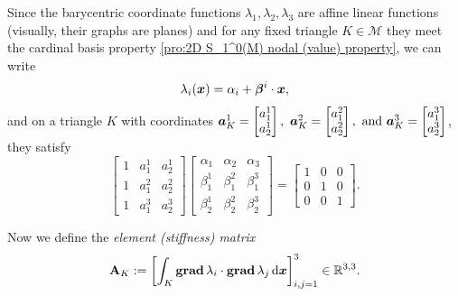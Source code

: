 	Since the barycentric coordinate functions 
	$\lambda_1,\lambda_2,\lambda_3$ are affine linear functions (visually, 
	their graphs are planes) and for any fixed triangle $K\in\mathcal{M}$
 	they meet the cardinal basis property
	\eqref{pro:2D S_1^0(M) nodal (value) property}, we can write
	\begin{equation}
		\lambda_i(\bm{x})=\alpha_i+\bm{\beta}^i\cdot\bm{x},
	\end{equation}
	and on a triangle $K$ with coordinates $
	\ba_K^1=\begin{bmatrix}a^1_1\\a^1_2\end{bmatrix},\ 
	\ba_K^2=\begin{bmatrix}a^2_1\\a^2_2\end{bmatrix},\ \textrm{and }
	\ba_K^3=\begin{bmatrix}a^3_1\\a^3_2\end{bmatrix}$,
	they satisfy
	\begin{equation}\label{eq:barycentric LSF}
		\begin{bmatrix}
			1 &a^1_1 &a^1_2\\
			1 &a^2_1 &a^2_2\\
			1 &a^3_1 &a^3_2
		\end{bmatrix}
		\begin{bmatrix}
			\alpha_1  &\alpha_2  &\alpha_3\\
			\beta^1_1 &\beta^2_1 &\beta^3_1\\
			\beta^1_2 &\beta^2_2 &\beta^3_2
		\end{bmatrix}=
		\begin{bmatrix}
			1 &0 &0\\
			0 &1 &0\\
			0 &0 &1
		\end{bmatrix}.	
	\end{equation}
	
	Now we define the \emph{element (stiffness) matrix}
	\begin{equation}\label{def:2D element (stiffness) matrix}
		\mathbf{A}_K:=\left[\int_K\mathbf{grad}\,\lambda_i\cdot
			\mathbf{grad}\,\lambda_j\,\mathrm{d}\bm{x}\right]_{i,j=1}^3\in\mathbb{R}^{3,3}.
	\end{equation}	
	
